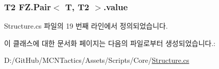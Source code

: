 \subsubsection[{\texorpdfstring{value}{value}}]{\setlength{\rightskip}{0pt plus 5cm}T2 {\bf F\+Z.\+Pair}$<$ T, T2 $>$.value\hspace{0.3cm}{\ttfamily [inherited]}}\hypertarget{class_f_z_1_1_pair_a548bd4cfb4d1587016f1f53be6fac5b8}{}\label{class_f_z_1_1_pair_a548bd4cfb4d1587016f1f53be6fac5b8}


Structure.\+cs 파일의 19 번째 라인에서 정의되었습니다.



이 클래스에 대한 문서화 페이지는 다음의 파일로부터 생성되었습니다.\+:\begin{DoxyCompactItemize}
\item 
D\+:/\+Git\+Hub/\+M\+C\+N\+Tactics/\+Assets/\+Scripts/\+Core/\hyperlink{_structure_8cs}{Structure.\+cs}\end{DoxyCompactItemize}
